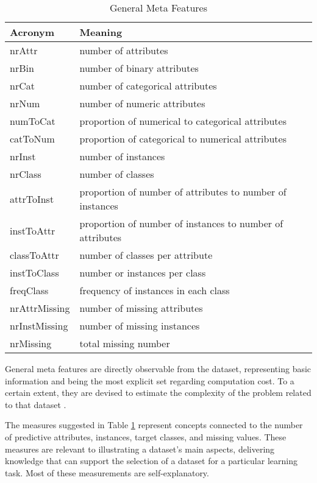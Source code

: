 \begin{table}[h!]
\centering
\caption{General Meta Features}
\setlength{\tabcolsep}{8pt}
	\renewcommand{\arraystretch}{1.2}
    \begin{tabular}{ll}
    \hline
    Acronym & Meaning  \\ \hline
    nrAttr & number of attributes \\
    nrBin & number of binary attributes \\ 
    nrCat & number of categorical attributes \\
    nrNum & number of numeric attributes \\
    numToCat & proportion of numerical to categorical attributes\\
    catToNum & proportion of categorical to numerical attributes \\
    nrInst & number of instances\\
    nrClass & number of classes\\
    attrToInst & proportion of number of attributes to number of instances\\
    instToAttr & proportion of number of instances to number of attributes\\
    classToAttr & number of classes per attribute\\
    instToClass & number or instances per class\\
    freqClass & frequency of instances in each class\\
    nrAttrMissing & number of missing attributes\\
    nrInstMissing & number of missing instances\\
    nrMissing & total missing number \\
    \hline
    \end{tabular}
\label{tab:general-mf}
\end{table}

General meta features are directly observable from the dataset, representing basic information and being the most explicit set regarding computation cost. To a certain extent, they are devised to estimate the complexity of the problem related to that dataset \citep{bilalli2017predictive}.

The measures suggested in Table \ref{tab:general-mf} represent concepts connected to the number of predictive attributes, instances, target classes, and missing values. These measures are relevant to illustrating a dataset's main aspects, delivering knowledge that can support the selection of a dataset for a particular learning task. Most of these measurements are self-explanatory.

